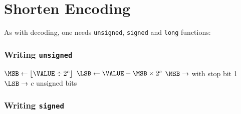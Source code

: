 \begin{table}[h]
{\begin{tabular}{rr>{$}r<{$}>{$}r<{$}||>{$}r<{$}}
  \end{tabular}
  \renewcommand{\arraystretch}{1.0}
}
\end{table}

\clearpage

\section{Shorten Encoding}
As with decoding, one needs \texttt{unsigned}, \texttt{signed} and \texttt{long}
functions:

\subsubsection{Writing \texttt{unsigned}}
$\text{\MSB} \leftarrow \lfloor\text{\VALUE} \div 2 ^ c\rfloor$\;
$\text{\LSB} \leftarrow \text{\VALUE} - \text{\MSB} \times 2 ^ c$\;
$\MSB \rightarrow$ \WUNARY with stop bit 1\;
$\LSB \rightarrow$ \WRITE $c$ unsigned bits\;
\EALGORITHM

\subsubsection{Writing \texttt{signed}}
\EALGORITHM


